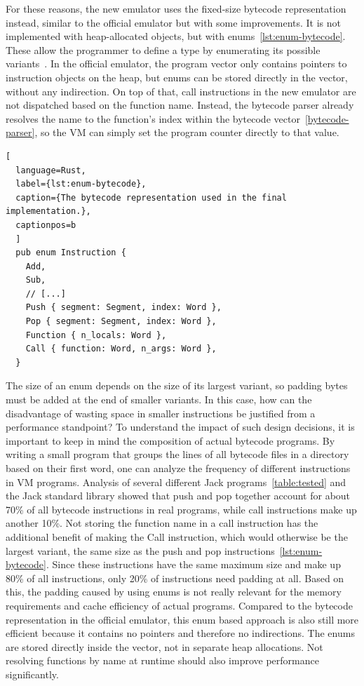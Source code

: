 For these reasons, the new emulator uses the fixed-size bytecode representation instead, similar to the official emulator but with some improvements.
It is not implemented with heap-allocated objects, but with enums~\ref{lst:enum-bytecode}.
These allow the programmer to define a type by enumerating its possible variants~\cite[Chapter~6]{klabnik2019rust}.
In the official emulator, the program vector only contains pointers to instruction objects on the heap, but enums can be stored directly in the vector, without any indirection.
On top of that, call instructions in the new emulator are not dispatched based on the function name.
Instead, the bytecode parser already resolves the name to the function's index within the bytecode vector~\ref{bytecode-parser}, so the VM can simply set the program counter directly to that value.
\begin{lstlisting}[
  language=Rust,
  label={lst:enum-bytecode},
  caption={The bytecode representation used in the final implementation.},
  captionpos=b
  ]
  pub enum Instruction {
    Add,
    Sub,
    // [...]
    Push { segment: Segment, index: Word },
    Pop { segment: Segment, index: Word },
    Function { n_locals: Word },
    Call { function: Word, n_args: Word },
  }
\end{lstlisting}
The size of an enum depends on the size of its largest variant, so padding bytes must be added at the end of smaller variants.
In this case, how can the disadvantage of wasting space in smaller instructions be justified from a performance standpoint?
To understand the impact of such design decisions, it is important to keep in mind the composition of actual bytecode programs.
By writing a small program that groups the lines of all bytecode files in a directory based on their first word, one can analyze the frequency of different instructions in VM programs.
Analysis of several different Jack programs~\ref{table:tested} and the Jack standard library showed that push and pop together account for about 70\% of all bytecode instructions in real programs, while call instructions make up another 10\%.
Not storing the function name in a call instruction has the additional benefit of making the Call instruction, which would otherwise be the largest variant, the same size as the push and pop instructions~\ref{lst:enum-bytecode}.
Since these instructions have the same maximum size and make up 80\% of all instructions, only 20\% of instructions need padding at all.
Based on this, the padding caused by using enums is not really relevant for the memory requirements and cache efficiency of actual programs.
Compared to the bytecode representation in the official emulator, this enum based approach is also still more efficient because it contains no pointers and therefore no indirections.
The enums are stored directly inside the vector, not in separate heap allocations.
Not resolving functions by name at runtime should also improve performance significantly.

